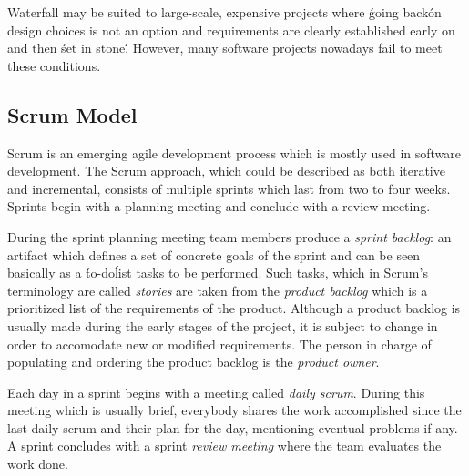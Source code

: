 Waterfall may be suited to large-scale, expensive projects where \'going back\' on design choices is not an option and requirements are clearly established early on and then \'set in stone\'.
However, many software projects nowadays fail to meet these conditions. \cite{WaterfallModel}

\subsection{Scrum Model}

Scrum is an emerging agile development process which is mostly used in software development.
The Scrum approach, which could be described as both iterative and incremental, consists of multiple sprints which last from two to four weeks. 
Sprints begin with a planning meeting and conclude with a review meeting.

During the sprint planning meeting team members produce a \emph{sprint backlog}: an artifact which defines a set of concrete goals of the sprint and can be seen basically as a \'to-do\' list tasks to be performed.
Such tasks, which in Scrum's terminology are called \emph{stories} are taken from the \emph{product backlog} which is a prioritized list of the requirements of the product.
Although a product backlog is usually made during the early stages of the project, it is subject to change in order to accomodate new or modified requirements. 
The person in charge of populating and ordering the product backlog is the \emph{product owner}.

Each day in a sprint begins with a meeting called \emph{daily scrum}. 
During this meeting which is usually brief, everybody shares the work accomplished since the last daily scrum and their plan for the day, mentioning eventual problems if any. 
A sprint concludes with a sprint \textit{review meeting} where the team evaluates the work done.

